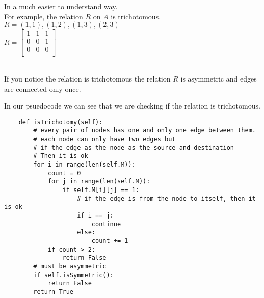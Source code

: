 In a much easier to understand way. \\
For example, the relation $R$ on $A$ is trichotomous. \\

$R = {(1,1),(1,2),(1,3),(2,3)}$ \\ 

$R = \begin{bmatrix}
    1 & 1 & 1 \\
    0 & 0 & 1 \\
    0 & 0 & 0 \\
\end{bmatrix}$ \\

 \\

If you notice the relation is trichotomous the relation $R$ is asymmetric and edges are connected only once.

In our psuedocode we can see that we are checking if the relation is trichotomous. \\
\begin{lstlisting}
    def isTrichotomy(self):
        # every pair of nodes has one and only one edge between them.                 
        # each node can only have two edges but 
        # if the edge as the node as the source and destination
        # Then it is ok
        for i in range(len(self.M)):
            count = 0
            for j in range(len(self.M)):
                if self.M[i][j] == 1:
                    # if the edge is from the node to itself, then it is ok
                    if i == j:
                        continue
                    else:
                        count += 1
            if count > 2:
                return False
        # must be asymmetric
        if self.isSymmetric():
            return False            
        return True
\end{lstlisting}



